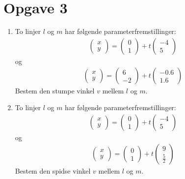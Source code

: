 \section*{Opgave 3}
\begin{enumerate}[label=\roman*)]
	\item To linjer $l$ og $m$ har følgende parameterfremstillinger:
	\begin{align*}
		\begin{pmatrix}
			x \\ y
		\end{pmatrix}=
		\begin{pmatrix}
			0 \\ 1
		\end{pmatrix}+ t
		\begin{pmatrix}
			-4 \\ 5
		\end{pmatrix}
	\end{align*}
	og
	\begin{align*}
		\begin{pmatrix}
			x \\ y
		\end{pmatrix}
		=
		\begin{pmatrix}
			6 \\ -2
		\end{pmatrix}
		+ t
		\begin{pmatrix}
			-0.6 \\
			1.6
		\end{pmatrix}
	\end{align*}
	Bestem den stumpe vinkel $v$ mellem $l$ og $m$. 
	
	\item To linjer $l$ og $m$ har følgende parameterfremstillinger:
	\begin{align*}
		\begin{pmatrix}
			x \\ y
		\end{pmatrix}=
		\begin{pmatrix}
			0 \\ 1
		\end{pmatrix}+ t
		\begin{pmatrix}
			-4 \\ 5
		\end{pmatrix}
	\end{align*}
	og 
	\begin{align*}
		\begin{pmatrix}
			x \\ y
		\end{pmatrix}
		=
		\begin{pmatrix}
			0 \\ 1
		\end{pmatrix}
		+ t
		\begin{pmatrix}
			9 \\ \frac{5}{2}
		\end{pmatrix}
	\end{align*}
	Bestem den spidse vinkel $v$ mellem $l$ og $m$. 
\end{enumerate}


